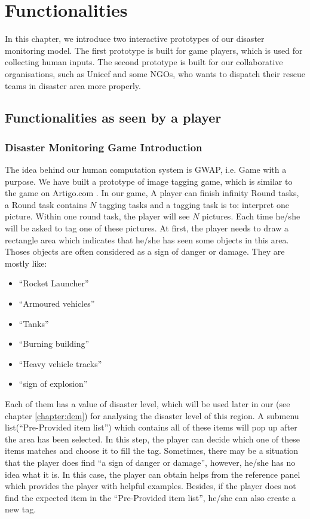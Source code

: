 \section{Functionalities}

In this chapter,
we introduce two interactive prototypes of our disaster monitoring model.
The first prototype is built for game players,
which is used for collecting human inputs.
The second prototype is built for our collaborative organisations,
such as Unicef and some NGOs,
who wants to dispatch their rescue teams in disaster area more properly. 

\subsection{Functionalities as seen by a player}
\subsubsection{Disaster Monitoring Game Introduction}
The idea behind our human computation system is GWAP,
i.e. Game with a purpose.
We have built a prototype of image tagging game,
which is similar to the game on Artigo.com \cite{wieser2013artigo}.
In our game,
A player can finish infinity Round tasks, 
a Round task contains $N$ tagging tasks and a tagging task is to:
interpret one picture.
Within one round task, the player will see $N$ pictures.
Each time he/she will be asked to tag one of these pictures.
At first,
the player needs to draw a rectangle area which indicates that he/she has seen some objects in this area.
Thoses objects are often considered as a sign of danger or damage.
They are mostly like:

\begin{itemize}
  \item ``Rocket Launcher''
  \item ``Armoured vehicles''
  \item ``Tanks''
  \item ``Burning building''
  \item ``Heavy vehicle tracks''
  \item ``sign of explosion''
\end{itemize}

Each of them has a value of disaster level, 
which will be used later in our (see chapter \ref{chapter:dem}) for analysing the disaster level of this region.
A submenu list(``Pre-Provided item list'') which contains all of these items will pop up after the area has been selected.
In this step,
the player can decide which one of these items matches and choose it to fill the tag.
Sometimes,
there may be a situation that the player does find ``a sign of danger or damage'',
however, he/she has no idea what it is.
In this case, 
the player can obtain helps from the reference panel which provides the player with helpful examples.
Besides, 
if the player does not find the expected item in the ``Pre-Provided item list'',
he/she can also create a new tag.

